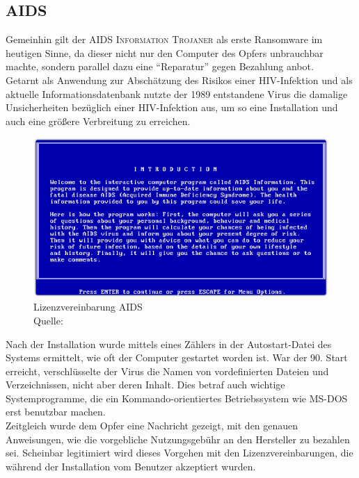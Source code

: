 	\subsection{AIDS}
		Gemeinhin gilt der \textsc{AIDS Information Trojaner} als erste Ransomware im heutigen Sinne, da dieser nicht nur den Computer des Opfers unbrauchbar machte, sondern
		parallel dazu eine "`Reparatur"' gegen Bezahlung anbot. \\
		Getarnt als Anwendung zur Abschätzung des Risikos einer HIV-Infektion und als aktuelle Informationsdatenbank nutzte der 1989 entstandene Virus die damalige
		Unsicherheiten bezüglich einer HIV-Infektion aus, um so eine Installation und auch eine größere Verbreitung zu erreichen.
	\begin{figure}[h!]
		\centering
		\includegraphics[width=\linewidth]{img/aids1.png}
		\caption{Lizenzvereinbarung AIDS \\ Quelle: \cite{aids:sophos}}
		\label{fig:lizenz_aids}
	\end{figure}

		Nach der Installation wurde mittels eines Zählers in der Autostart-Datei des Systems ermittelt, wie oft der Computer gestartet worden ist. War der 90. Start
		erreicht, verschlüsselte der Virus die Namen von vordefinierten Dateien und Verzeichnissen, nicht aber deren Inhalt. Dies betraf auch wichtige Systemprogramme, die
		ein Kommando-orientiertes Betriebssystem wie MS-DOS erst benutzbar machen. \\
		Zeitgleich wurde dem Opfer eine Nachricht gezeigt, mit den genauen Anweisungen, wie die vorgebliche Nutzungsgebühr an den Hersteller zu bezahlen sei.
		Scheinbar legitimiert wird dieses Vorgehen mit den Lizenzvereinbarungen, die während der Installation vom Benutzer akzeptiert wurden.

